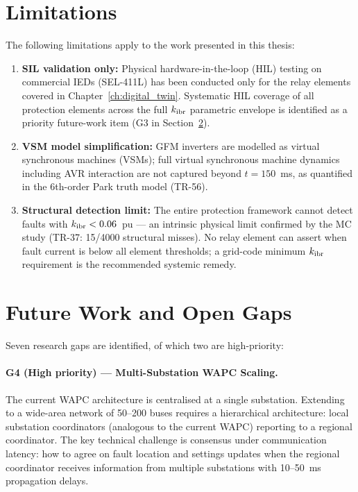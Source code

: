 \section{Limitations}
\label{sec:ch10_limitations}

The following limitations apply to the work presented in this thesis:

\begin{enumerate}
\item \textbf{SIL validation only:} Physical hardware-in-the-loop (HIL)
      testing on commercial IEDs (SEL-411L) has been conducted only for
      the relay elements covered in Chapter~\ref{ch:digital_twin}.
      Systematic HIL coverage of all protection elements across the full
      $k_{\mathrm{ibr}}$ parametric envelope is identified as a priority future-work
      item (G3 in Section~\ref{sec:ch10_gaps}).

\item \textbf{VSM model simplification:} GFM inverters are modelled as
      virtual synchronous machines (VSMs); full virtual synchronous machine
      dynamics including AVR interaction are not captured beyond $t = 150$~ms,
      as quantified in the 6th-order Park truth model (TR-56).

\item \textbf{Structural detection limit:} The entire protection framework
      cannot detect faults with $k_{\mathrm{ibr}} < 0.06$~pu — an intrinsic physical
      limit confirmed by the MC study (TR-37: 15/4000 structural misses).
      No relay element can assert when fault current is below all element
      thresholds; a grid-code minimum $k_{\mathrm{ibr}}$ requirement is the recommended
      systemic remedy.
\end{enumerate}

\section{Future Work and Open Gaps}
\label{sec:ch10_gaps}

Seven research gaps are identified, of which two are high-priority:

\paragraph{G4 (High priority) — Multi-Substation WAPC Scaling.}
The current WAPC architecture is centralised at a single substation.
Extending to a wide-area network of 50--200 buses requires a hierarchical
architecture: local substation coordinators (analogous to the current
WAPC) reporting to a regional coordinator. The key technical challenge
is consensus under communication latency: how to agree on fault
location and settings updates when the regional coordinator receives
information from multiple substations with 10--50~ms propagation delays.

